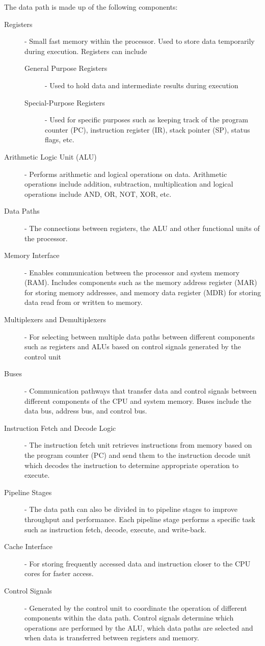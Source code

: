 \documentclass[12pt letter]{report}
\begin{document}
The data path is made up of the following components:
\begin{description}
  \item[Registers] - Small fast memory within the processor. Used to store data temporarily during execution. Registers can include
        \begin{description}
          \item[General Purpose Registers]  - Used to hold data and intermediate results during execution
          \item[Special-Purpose Registers] - Used for specific purposes such as keeping track of the program counter (PC), instruction register (IR), stack pointer (SP), status flags, etc.
        \end{description}
  \item[Arithmetic Logic Unit (ALU)] - Performs arithmetic and logical operations on data. Arithmetic operations include addition, subtraction, multiplication
        and logical operations include AND, OR, NOT, XOR, etc.
  \item[Data Paths] - The connections between registers, the ALU and other functional units of the processor.
  \item[Memory Interface] - Enables communication between the processor and system memory (RAM). Includes components such as the
        memory address register (MAR) for storing memory addresses, and memory data register (MDR) for storing data read from or written to memory.
  \item[Multiplexers and Demultiplexers] - For selecting between multiple data paths between different components such as registers and ALUs based on control signals generated by the control unit
  \item[Buses] - Communication pathways that transfer data and control signals between different components of the CPU and system memory. Buses
        include the data bus, address bus, and control bus.
  \item[Instruction Fetch and Decode Logic] - The instruction fetch unit retrieves instructions from memory based on the program counter (PC) and
        send them to the instruction decode unit which decodes the instruction to determine appropriate operation to execute.
  \item[Pipeline Stages] - The data path can also be divided in to pipeline stages to improve throughput and performance. Each pipeline stage
        performs a specific task such as instruction fetch, decode, execute, and write-back.
  \item[Cache Interface] - For storing frequently accessed data and instruction closer to the CPU cores for faster access.
  \item[Control Signals] - Generated by the control unit to coordinate the operation of different components within the data path.
        Control signals determine which operations are performed by the ALU, which data paths are selected and when data is transferred between registers and memory.
\end{description}
\end{document}
